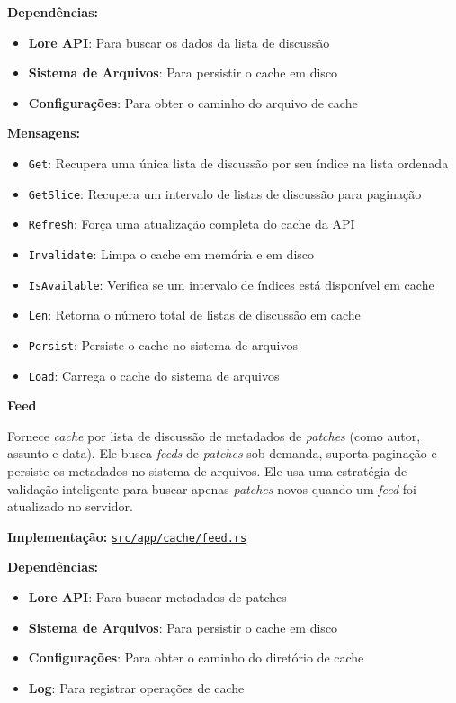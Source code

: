 \textbf{Dependências:}

\begin{itemize}
    \item \textbf{Lore API}: Para buscar os dados da lista de discussão
    \item \textbf{Sistema de Arquivos}: Para persistir o cache em disco
    \item \textbf{Configurações}: Para obter o caminho do arquivo de cache
\end{itemize}

\textbf{Mensagens:}

\begin{itemize}
    \item \texttt{Get}: Recupera uma única lista de discussão por seu índice na lista ordenada
    \item \texttt{GetSlice}: Recupera um intervalo de listas de discussão para paginação
    \item \texttt{Refresh}: Força uma atualização completa do cache da API
    \item \texttt{Invalidate}: Limpa o cache em memória e em disco
    \item \texttt{IsAvailable}: Verifica se um intervalo de índices está disponível em cache
    \item \texttt{Len}: Retorna o número total de listas de discussão em cache
    \item \texttt{Persist}: Persiste o cache no sistema de arquivos
    \item \texttt{Load}: Carrega o cache do sistema de arquivos
\end{itemize}

\textbf{Feed}

Fornece \emph{cache} por lista de discussão de metadados de \emph{patches} (como autor, assunto e data). Ele busca \emph{feeds} de \emph{patches} sob demanda, suporta paginação e persiste os metadados no sistema de arquivos. Ele usa uma estratégia de validação inteligente para buscar apenas \emph{patches} novos quando um \emph{feed} foi atualizado no servidor.

\textbf{Implementação:} \href{https://github.com/nahharris/ph-actors-tcc/blob/master/src/app/cache/feed.rs}{\texttt{src/app/cache/feed.rs}}

\textbf{Dependências:}

\begin{itemize}
    \item \textbf{Lore API}: Para buscar metadados de patches
    \item \textbf{Sistema de Arquivos}: Para persistir o cache em disco
    \item \textbf{Configurações}: Para obter o caminho do diretório de cache
    \item \textbf{Log}: Para registrar operações de cache
\end{itemize}

